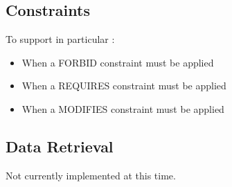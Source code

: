 \documentclass[10pt]{article}
\begin{document}
\subsection{Constraints}

To support in particular :

\begin{itemize}
\item When a FORBID constraint must be applied
\item When a REQUIRES constraint must be applied
\item When a MODIFIES constraint must be applied
\end{itemize}


\subsection{Data Retrieval}

Not currently implemented at this time.
\end{document}
